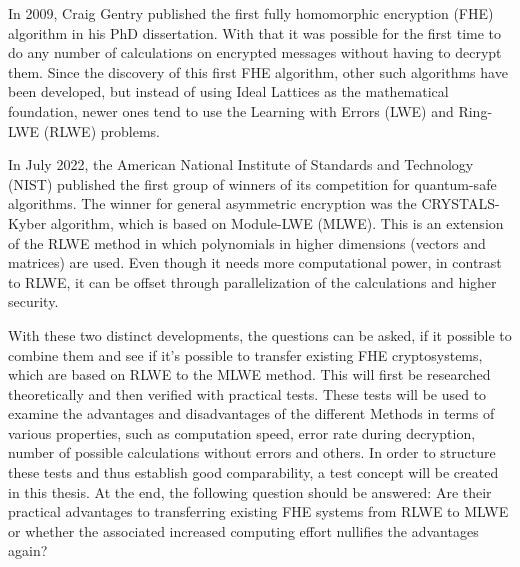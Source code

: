 
In 2009, Craig Gentry published the first fully homomorphic encryption (FHE) algorithm in his PhD dissertation. With that it was possible for the first time to do any number of calculations on encrypted messages without having to decrypt them. Since the discovery of this first FHE algorithm, other such algorithms have been developed, but instead of using Ideal Lattices as the mathematical foundation, newer ones tend to use the Learning with Errors (LWE) and Ring-LWE (RLWE) problems.

In July 2022, the American National Institute of Standards and Technology (NIST) published the first group of winners of its competition for quantum-safe algorithms. The winner for general asymmetric encryption was the CRYSTALS-Kyber algorithm, which is based on Module-LWE (MLWE). This is an extension of the RLWE method in which polynomials in higher dimensions (vectors and matrices) are used. Even though it needs more computational power, in contrast to RLWE, it can be offset through parallelization of the calculations and higher security.

With these two distinct developments, the questions can be asked, if it possible to combine them and see if it’s possible to transfer existing FHE cryptosystems, which are based on RLWE to the MLWE method. This will first be researched theoretically and then verified with practical tests. 
These tests will be used to examine the advantages and disadvantages of the different Methods in terms of various properties, such as computation speed, error rate during decryption, number of possible calculations without errors and others. In order to structure these tests and thus establish good comparability, a test concept will be created in this thesis. 
At the end, the following question should be answered: Are their practical advantages to transferring existing FHE systems from RLWE to MLWE or whether the associated increased computing effort nullifies the advantages again?